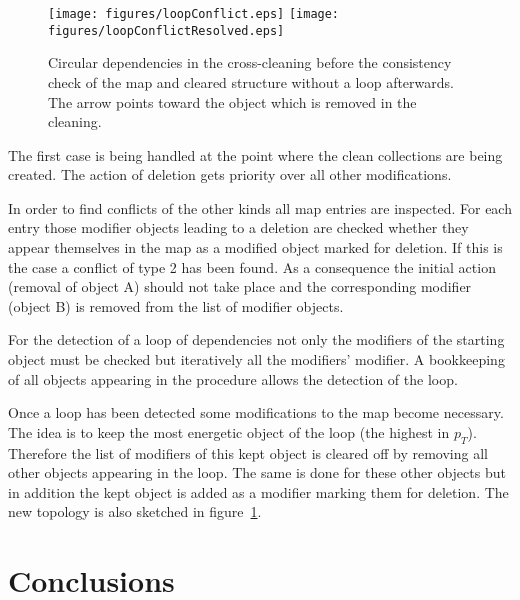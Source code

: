 \documentclass{cmspaper}
\begin{document}
\begin{figure}[hb]
\begin{center}
    \texttt{[image: figures/loopConflict.eps]}
    \hspace*{1.5cm}
    \texttt{[image: figures/loopConflictResolved.eps]}
    \caption{Circular dependencies in the cross-cleaning before the 
    consistency check of the map and cleared structure without a loop
    afterwards. The arrow points toward the object which is removed in the
    cleaning.}
    \label{fig:loopReso}
\end{center}
\end{figure}

The first case is being handled at the point where the clean collections are
being created. The action of deletion gets priority over all other
modifications.

In order to find conflicts of the other kinds all map entries are inspected.
For each entry those modifier objects leading to a deletion are checked whether
they appear themselves in the map as a modified object marked for deletion. If
this is the case a conflict of type 2 has been found. As a consequence the
initial action (removal of object A)  should not take place and the
corresponding modifier (object B) is removed from the list of modifier objects.

For the detection of a loop of dependencies not only the modifiers of the
starting object must be checked but iteratively all the modifiers' modifier. A
bookkeeping of all objects appearing in the procedure allows the detection of
the loop.

Once a loop has been detected some modifications to the map become necessary.
The idea is to keep the most energetic object of the loop (the highest in
$p_T$). Therefore the list of modifiers of this kept object is cleared off by
removing all other objects appearing in the loop.  The same is done for these
other objects but in addition the kept object is added as a modifier marking
them for deletion. The new topology is also sketched in
figure~\ref{fig:loopReso}.

\clearpage
\section{Conclusions}
\end{document}
